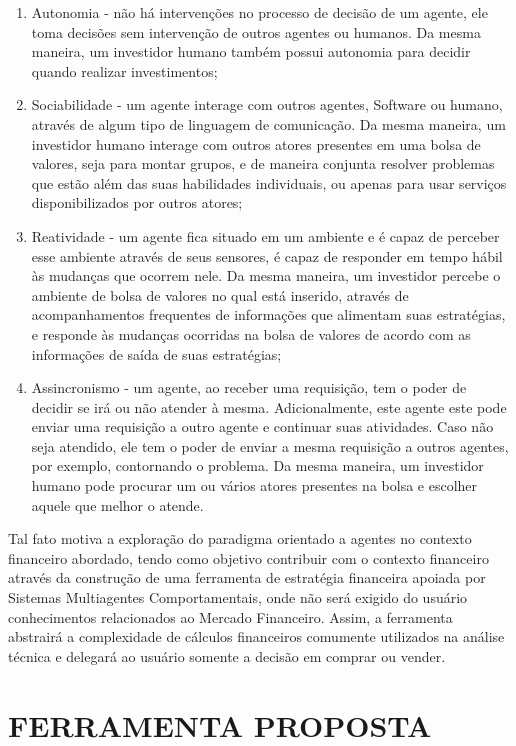\begin{enumerate}
\item Autonomia - não há intervenções no processo de decisão de um agente, ele toma decisões sem intervenção de outros agentes ou humanos. Da mesma maneira, um investidor humano também possui autonomia para decidir quando realizar investimentos;
\item Sociabilidade - um agente interage com outros agentes, Software ou humano, através de  algum tipo de linguagem de comunicação. Da mesma maneira, um investidor humano interage com outros atores presentes em uma bolsa de valores, seja para montar grupos, e de maneira conjunta resolver problemas que estão além das suas habilidades individuais, ou apenas para usar serviços disponibilizados por outros atores;
\item Reatividade - um agente fica situado em um ambiente e é capaz de perceber esse ambiente através de seus sensores, é capaz de responder em tempo hábil às mudanças que ocorrem nele. Da mesma maneira, um investidor percebe o ambiente de bolsa de valores no qual está inserido, através de acompanhamentos frequentes de informações que alimentam suas estratégias, e responde às mudanças ocorridas na bolsa de valores de acordo com as informações de saída de suas estratégias;
\item Assincronismo -  um agente, ao receber uma requisição, tem o poder de decidir se irá ou não atender à mesma. Adicionalmente, este agente este pode enviar uma requisição a outro agente e continuar suas atividades. Caso não seja atendido, ele tem o poder de enviar a mesma requisição a outros agentes, por exemplo, contornando o problema. Da mesma maneira, um investidor humano pode procurar um ou vários atores presentes na bolsa e escolher aquele que melhor o atende.

\end{enumerate}

Tal fato motiva a exploração do paradigma orientado a agentes no contexto financeiro abordado, tendo como objetivo contribuir com o contexto financeiro através da construção de uma ferramenta de estratégia financeira apoiada por Sistemas Multiagentes Comportamentais, onde não será exigido do usuário conhecimentos relacionados ao Mercado Financeiro. Assim, a ferramenta abstrairá a complexidade de cálculos financeiros comumente utilizados na análise técnica e delegará ao usuário somente a decisão em comprar ou vender.

\section{FERRAMENTA PROPOSTA}

